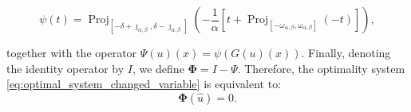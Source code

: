 \documentclass[11pt,a4paper]{amsart}
\renewcommand{\l}{\left}
\renewcommand{\r}{\right}
\newcommand{\om}{\Omega}
\newcommand{\ga}{\Gamma}
\newcommand{\sign}{\mathrm{sign}}
\DeclareMathOperator{\proj}{Proj}
\newcommand{\norm}[1]{\lVert #1 \rVert}
\begin{document}
\begin{equation}\label{eq:psi}   
\psi(t)= \proj_{[-\delta+\jmath_{\alpha,\beta}, \delta-\jmath_{\alpha, \beta}]}\l(-\frac{1}{\alpha}\l[t+\proj_{[-\omega_{\alpha,\beta},\omega_{\alpha,\beta}]}(-t)\r]\r),
\end{equation}

together with the operator $\Psi (u)(x)=\psi(G(u)(x))$. Finally, denoting the identity operator by $I$, we define $\mathbf{\Phi}=I-\Psi$. Therefore, the optimality system \eqref{eq:optimal_system_changed_variable} is equivalent to:
$$\mathbf{\Phi}(\hat u) =0.$$

\end{document}
